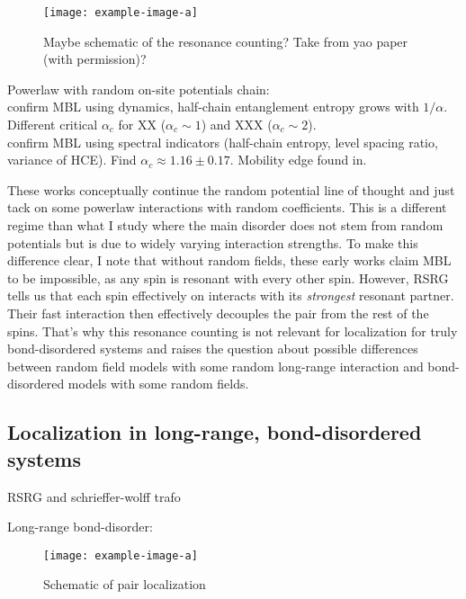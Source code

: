 \begin{figure}[htb]
	\centering
	\texttt{[image: example-image-a]}
	\caption{Maybe schematic of the resonance counting? Take from yao paper (with permission)?}
\end{figure}

Powerlaw with random on-site potentials chain:\\ \cite{safavi-nainiQuantumDynamicsDisordered2019} confirm MBL using dynamics, half-chain entanglement entropy grows with $1/\alpha$. Different critical $\alpha_c$ for XX ($\alpha_c\sim1$) and XXX ($\alpha_c\sim2$). \\
\cite{schifferManybodyLocalizationSpin2019} confirm MBL using spectral indicators (half-chain entropy, level spacing ratio, variance of HCE). Find $\alpha_c \approx 1.16\pm0.17$. Mobility edge found in\cite{yousefjaniMobilityEdgeLongrange2023}.

These works conceptually continue the random potential line of thought and just tack on some powerlaw interactions with random coefficients. This is a different regime than what I study where the main disorder does not stem from random potentials but is due to widely varying interaction strengths. To make this difference clear, I note that without random fields, these early works claim MBL to be impossible, as any spin is resonant with every other spin. However, RSRG tells us that each spin effectively on interacts with its \emph{strongest} resonant partner. Their fast interaction then effectively decouples the pair from the rest of the spins. That's why this resonance counting is not relevant for localization for truly bond-disordered systems and raises the question about possible differences between random field models with some random long-range interaction and bond-disordered models with some random fields.


\subsection{Localization in long-range, bond-disordered systems}
RSRG and schrieffer-wolff trafo

Long-range bond-disorder:
\cite{mohdebEntanglementPropertiesDisordered2020,mohdebExcitedEigenstateEntanglementProperties2022,mohdebGlobalQuenchDynamics2023}

\begin{figure}[htb]
	\centering
	\texttt{[image: example-image-a]}
	\caption{Schematic of pair localization}
\end{figure}


%
%
%
